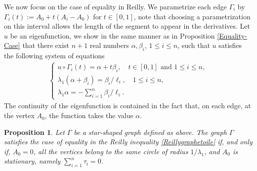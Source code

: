 \documentclass[12pt,english]{smfart} %
\newtheorem{proposition}[theorem]{Proposition}
\theoremstyle{remark}
\begin{document}
We now focus on the case of equality in Reilly. We parametrize each edge $\Gamma_i$ by $\Gamma_i(t):= A_0 + t(A_i-A_0)$ for $t\in[0,1]$, note that choosing a parametrization on this interval allows the length of the segment to appear in the derivatives. Let $u$ be an eigenfunction, we show in the same manner as in Proposition \ref{Equality-Case} that there exist $n+1$ real numbers $\alpha, \beta_i$, $1 \leqslant i \leqslant n$, such that $u$ satisfies the following system of equations 
\begin{align}\label{eqgraphetoile}
	\left\{
	\begin{array}{ll}
		u\circ \Gamma_i(t)=\alpha +t \beta_i, \quad   t\in[0,1] \text{ and }  1\leqslant i \leqslant n,\\
		\lambda_1(\alpha+\beta_i)= \beta_i/\ell_i, \quad1\leqslant i  \leqslant n,\\ \displaystyle
		\lambda_1\alpha = - \sum_{i=1}^n \beta_i/\ell_i.
	\end{array}
	\right. 
\end{align}
The continuity of the eigenfunction is contained in the fact that, on each edge, at the vertex $A_0$, the function takes the value $\alpha$.

\medskip\begin{proposition}
	Let $\Gamma$ be a star-shaped graph defined as above. The graph $\Gamma$ satisfies the case of equality in the Reilly inequality \ref{Reillygraphetoile} if, and only if, $A_0=0$, all the vertices belong to the same circle of radius $1/\lambda_1$, and $A_0$ is stationary, namely $\sum_{i=1}^n \tau_i = 0$.
\end{proposition}\leavevmode
\end{document}
